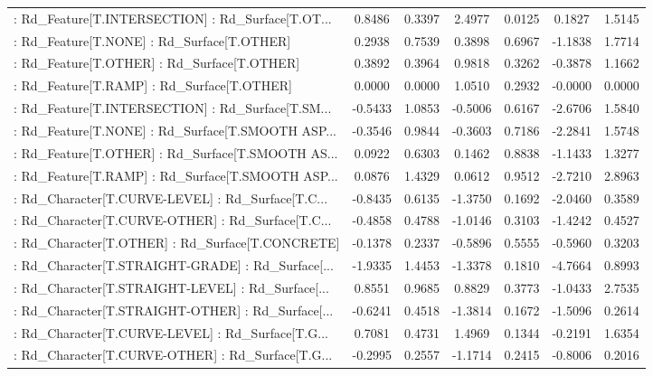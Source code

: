 \begin{longtable}{p{4cm}cccccc}
 : Rd\_Feature[T.INTERSECTION] : Rd\_Surface[T.OT... &  0.8486 &    0.3397 &  2.4977 &       0.0125 &  0.1827 &  1.5145 \\
 : Rd\_Feature[T.NONE] : Rd\_Surface[T.OTHER]        &  0.2938 &    0.7539 &  0.3898 &       0.6967 & -1.1838 &  1.7714 \\
 : Rd\_Feature[T.OTHER] : Rd\_Surface[T.OTHER]       &  0.3892 &    0.3964 &  0.9818 &       0.3262 & -0.3878 &  1.1662 \\
 : Rd\_Feature[T.RAMP] : Rd\_Surface[T.OTHER]        &  0.0000 &    0.0000 &  1.0510 &       0.2932 & -0.0000 &  0.0000 \\
 : Rd\_Feature[T.INTERSECTION] : Rd\_Surface[T.SM... & -0.5433 &    1.0853 & -0.5006 &       0.6167 & -2.6706 &  1.5840 \\
 : Rd\_Feature[T.NONE] : Rd\_Surface[T.SMOOTH ASP... & -0.3546 &    0.9844 & -0.3603 &       0.7186 & -2.2841 &  1.5748 \\
 : Rd\_Feature[T.OTHER] : Rd\_Surface[T.SMOOTH AS... &  0.0922 &    0.6303 &  0.1462 &       0.8838 & -1.1433 &  1.3277 \\
 : Rd\_Feature[T.RAMP] : Rd\_Surface[T.SMOOTH ASP... &  0.0876 &    1.4329 &  0.0612 &       0.9512 & -2.7210 &  2.8963 \\
 : Rd\_Character[T.CURVE-LEVEL] : Rd\_Surface[T.C... & -0.8435 &    0.6135 & -1.3750 &       0.1692 & -2.0460 &  0.3589 \\
 : Rd\_Character[T.CURVE-OTHER] : Rd\_Surface[T.C... & -0.4858 &    0.4788 & -1.0146 &       0.3103 & -1.4242 &  0.4527 \\
 : Rd\_Character[T.OTHER] : Rd\_Surface[T.CONCRETE]  & -0.1378 &    0.2337 & -0.5896 &       0.5555 & -0.5960 &  0.3203 \\
 : Rd\_Character[T.STRAIGHT-GRADE] : Rd\_Surface[... & -1.9335 &    1.4453 & -1.3378 &       0.1810 & -4.7664 &  0.8993 \\
 : Rd\_Character[T.STRAIGHT-LEVEL] : Rd\_Surface[... &  0.8551 &    0.9685 &  0.8829 &       0.3773 & -1.0433 &  2.7535 \\
 : Rd\_Character[T.STRAIGHT-OTHER] : Rd\_Surface[... & -0.6241 &    0.4518 & -1.3814 &       0.1672 & -1.5096 &  0.2614 \\
 : Rd\_Character[T.CURVE-LEVEL] : Rd\_Surface[T.G... &  0.7081 &    0.4731 &  1.4969 &       0.1344 & -0.2191 &  1.6354 \\
 : Rd\_Character[T.CURVE-OTHER] : Rd\_Surface[T.G... & -0.2995 &    0.2557 & -1.1714 &       0.2415 & -0.8006 &  0.2016 \\

\end{longtable}
